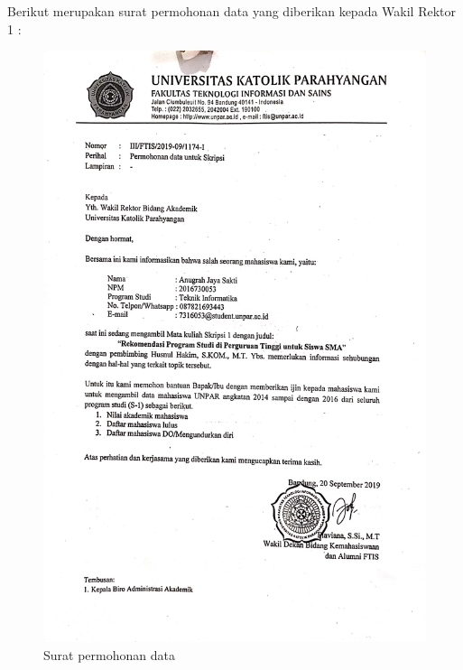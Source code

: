 \documentclass[a4paper,twoside]{article}
\begin{document}
\begin{enumerate}
			
			
			Berikut merupakan surat permohonan data yang diberikan kepada Wakil Rektor 1 :
			\begin{figure}[H]
				\centering
				\includegraphics[scale=0.11]{surat}
				\caption{Surat permohonan data}
			\end{figure}
			
			\newpage
			

\end{enumerate}
\end{document}
